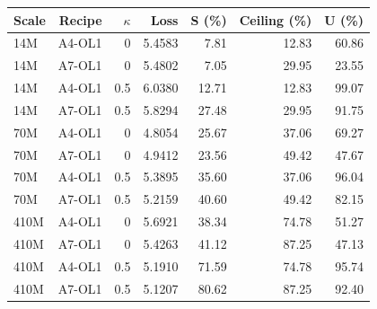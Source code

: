 \begin{tabular}{lrrrrrr}
\toprule
Scale & Recipe & $\kappa$ & Loss & S (\%) & Ceiling (\%) & U (\%) \\
\midrule
14M & A4-OL1 & 0 & 5.4583 & 7.81 & 12.83 & 60.86 \\
14M & A7-OL1 & 0 & 5.4802 & 7.05 & 29.95 & 23.55 \\
14M & A4-OL1 & 0.5 & 6.0380 & 12.71 & 12.83 & 99.07 \\
14M & A7-OL1 & 0.5 & 5.8294 & 27.48 & 29.95 & 91.75 \\
70M & A4-OL1 & 0 & 4.8054 & 25.67 & 37.06 & 69.27 \\
70M & A7-OL1 & 0 & 4.9412 & 23.56 & 49.42 & 47.67 \\
70M & A4-OL1 & 0.5 & 5.3895 & 35.60 & 37.06 & 96.04 \\
70M & A7-OL1 & 0.5 & 5.2159 & 40.60 & 49.42 & 82.15 \\
410M & A4-OL1 & 0 & 5.6921 & 38.34 & 74.78 & 51.27 \\
410M & A7-OL1 & 0 & 5.4263 & 41.12 & 87.25 & 47.13 \\
410M & A4-OL1 & 0.5 & 5.1910 & 71.59 & 74.78 & 95.74 \\
410M & A7-OL1 & 0.5 & 5.1207 & 80.62 & 87.25 & 92.40 \\
\bottomrule
\end{tabular}
